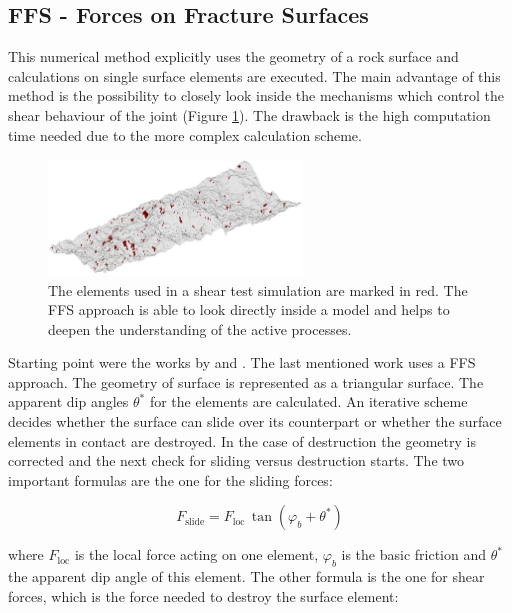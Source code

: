 \subsection{FFS - Forces on Fracture Surfaces}
\label{chap:NumPlatf:FFS}

This numerical method explicitly uses the geometry of a rock surface and calculations on single surface elements are executed. The main advantage of this method is the possibility to closely look inside the mechanisms which control the shear behaviour of the joint (Figure \ref{Fig:FFS-MarkedElements}). The drawback is the high computation time needed due to the more complex calculation scheme.

\begin{figure}[htb!]
\begin{center}
\includegraphics[width=0.6\textwidth]{./figures/FFS_MarkedSurfaceElements.png}
\end{center}
\caption{The elements used in a shear test simulation are marked in red. The FFS approach is able to look directly inside a model and helps to deepen the understanding of the active processes.}
\label{Fig:FFS-MarkedElements}
\end{figure}

Starting point were the works by \cite{Fathi2016} and \cite{Casagrande2017}. The last mentioned work uses a FFS approach. The geometry of surface is represented as a triangular surface. The apparent dip angles $\theta^\ast$ for the elements are calculated. An iterative scheme decides whether the surface can slide over its counterpart or whether the surface elements in contact are destroyed. In the case of destruction the geometry is corrected and the next check for sliding versus destruction starts. The two important formulas are the one for the sliding forces: 

\begin{equation}
F_\text{slide}=F_\text{loc} \, \tan (\varphi_b + \theta^\ast)
\end{equation}

where $F_\text{loc}$ is the local force acting on one element, $\varphi_b$ is the basic friction and $\theta^\ast$ the apparent dip angle of this element.
The other formula is the one for shear forces, which is the force needed to destroy the surface element:

